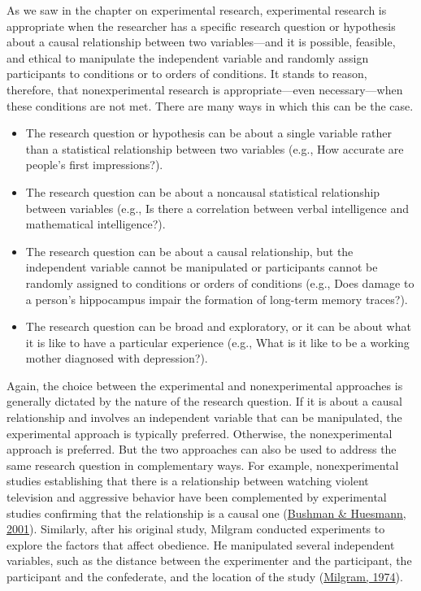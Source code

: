 \documentclass[
]{krantz}
\providecommand{\tightlist}{%
  \setlength{\itemsep}{0pt}\setlength{\parskip}{0pt}}
\begin{document}
As we saw in the chapter on experimental research, experimental research is appropriate when the researcher has a specific research question or hypothesis about a causal relationship between two variables---and it is possible, feasible, and ethical to manipulate the independent variable and randomly assign participants to conditions or to orders of conditions. It stands to reason, therefore, that nonexperimental research is appropriate---even necessary---when these conditions are not met. There are many ways in which this can be the case.

\begin{itemize}
\tightlist
\item
  The research question or hypothesis can be about a single variable rather than a statistical relationship between two variables (e.g., How accurate are people's first impressions?).
\item
  The research question can be about a noncausal statistical relationship between variables (e.g., Is there a correlation between verbal intelligence and mathematical intelligence?).
\item
  The research question can be about a causal relationship, but the independent variable cannot be manipulated or participants cannot be randomly assigned to conditions or orders of conditions (e.g., Does damage to a person's hippocampus impair the formation of long-term memory traces?).
\item
  The research question can be broad and exploratory, or it can be about what it is like to have a particular experience (e.g., What is it like to be a working mother diagnosed with depression?).
\end{itemize}

Again, the choice between the experimental and nonexperimental approaches is generally dictated by the nature of the research question. If it is about a causal relationship and involves an independent variable that can be manipulated, the experimental approach is typically preferred. Otherwise, the nonexperimental approach is preferred. But the two approaches can also be used to address the same research question in complementary ways. For example, nonexperimental studies establishing that there is a relationship between watching violent television and aggressive behavior have been complemented by experimental studies confirming that the relationship is a causal one (\protect\hyperlink{ref-bushman2001effects}{Bushman \& Huesmann, 2001}). Similarly, after his original study, Milgram conducted experiments to explore the factors that affect obedience. He manipulated several independent variables, such as the distance between the experimenter and the participant, the participant and the confederate, and the location of the study (\protect\hyperlink{ref-milgram1964obedience}{Milgram, 1974}).
\end{document}
